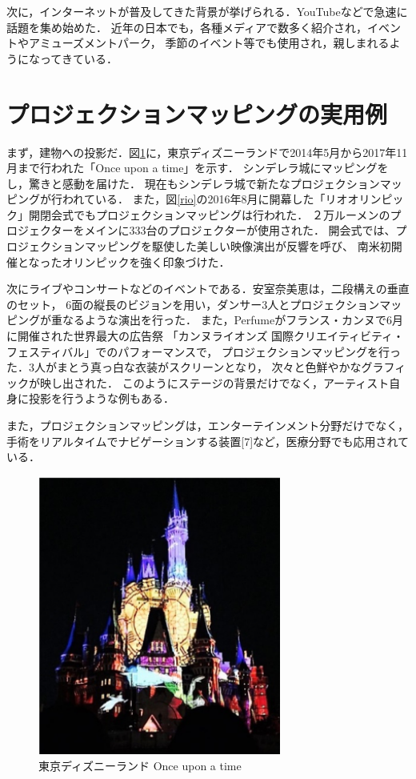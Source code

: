 次に，インターネットが普及してきた背景が挙げられる．YouTubeなどで急速に話題を集め始めた．
近年の日本でも，各種メディアで数多く紹介され，イベントやアミューズメントパーク，
季節のイベント等でも使用され，親しまれるようになってきている\cite{hoge}．



\section{プロジェクションマッピングの実用例}
まず，建物への投影だ．図\ref{disney}に，東京ディズニーランドで2014年5月から2017年11月まで行われた「Once upon a time」を示す．
シンデレラ城にマッピングをし，驚きと感動を届けた．
現在もシンデレラ城で新たなプロジェクションマッピングが行われている\cite{hoge}．
また，図\ref{rio}の2016年8月に開幕した「リオオリンピック」開閉会式でもプロジェクションマッピングは行われた． 
２万ルーメンのプロジェクターをメインに333台のプロジェクターが使用された．
開会式では、プロジェクションマッピングを駆使した美しい映像演出が反響を呼び、
南米初開催となったオリンピックを強く印象づけた\cite{hoge}．

次にライブやコンサートなどのイベントである．安室奈美恵は，二段構えの垂直のセット，
6面の縦長のビジョンを用い，ダンサー3人とプロジェクションマッピングが重なるような演出を行った\cite{hoge}．
また，Perfumeがフランス・カンヌで6月に開催された世界最大の広告祭
「カンヌライオンズ 国際クリエイティビティ・フェスティバル」でのパフォーマンスで，
プロジェクションマッピングを行った．3人がまとう真っ白な衣装がスクリーンとなり，
次々と色鮮やかなグラフィックが映し出された\cite{hoge}．
このようにステージの背景だけでなく，アーティスト自身に投影を行うような例もある．

また，プロジェクションマッピングは，エンターテインメント分野だけでなく，
手術をリアルタイムでナビゲーションする装置[7]など，医療分野でも応用されている．


\clearpage

\begin{figure}[t]
  \centering
  \includegraphics[width=8cm]{image/disney.png}
  \caption{東京ディズニーランド Once upon a time}
\label{disney}
\end{figure}

